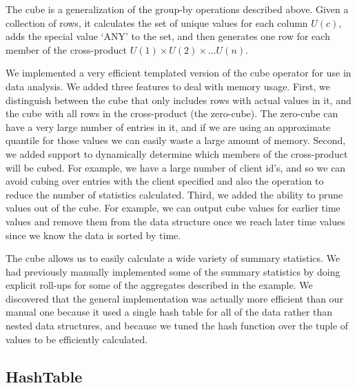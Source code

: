 The cube\cite{gray97cube} is a generalization of the group-by
operations described above.  Given a collection of rows, it calculates
the set of unique values for each column $U(c)$, adds the special
value `ANY' to the set, and then generates one row for each member of
the cross-product $U(1) \times U(2) \times ... U(n)$.

We implemented a very efficient templated version of the cube operator
for use in data analysis.  We added three features to deal with memory
usage.  First, we distinguish between the cube that only includes rows
with actual values in it, and the cube with all rows in the
cross-product (the zero-cube).  The zero-cube can have a very large
number of entries in it, and if we are using an approximate quantile
for those values we can easily waste a large amount of memory.
Second, we added support to dynamically determine which members of the
cross-product will be cubed.  For example, we have a large number of
client id's, and so we can avoid cubing over entries with the client
specified and also the operation to reduce the number of statistics
calculated.  Third, we added the ability to prune values out of the
cube. For example, we can output cube values for earlier time values
and remove them from the data structure once we reach later time
values since we know the data is sorted by time.

The cube allows us to easily calculate a wide variety of summary
statistics.  We had previously manually implemented some of the
summary statistics by doing explicit roll-ups for some of the
aggregates described in the example.  We discovered that the general
implementation was actually more efficient than our manual one because
it used a single hash table for all of the data rather than nested
data structures, and because we tuned the hash function over the tuple
of values to be efficiently calculated.

\subsection{HashTable}

